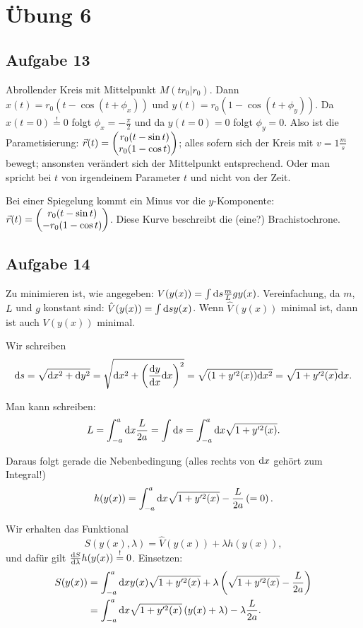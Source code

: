 \chapter*{Übung 6}

\section*{Aufgabe 13}

Abrollender Kreis mit Mittelpunkt $M(t r_0 | r_0)$. Dann $x(t) = r_0 (t - \cos (t + \phi_x))$ und $y(t) = r_0(1 - \cos(t + \phi_y))$. Da $x(t = 0) \overset{!}{=} 0$ folgt $\phi_x = -\frac{\pi}{2}$ und da $y(t = 0) = 0$ folgt $\phi_y = 0$. Also ist die Parametisierung: $\vec{r}(t) = \begin{pmatrix} r_0 (t - \sin t) \\ r_0 (1 - \cos t) \end{pmatrix}$; alles sofern sich der Kreis mit $v = 1 \frac{m}{s}$ bewegt; ansonsten verändert sich der Mittelpunkt entsprechend. Oder man spricht bei $t$ von irgendeinem Parameter $t$ und nicht von der Zeit. 

Bei einer Spiegelung kommt ein Minus vor die $y$-Komponente: $\vec{r}(t) = \begin{pmatrix} r_0 (t - \sin t) \\ - r_0 (1 - \cos t) \end{pmatrix}$. Diese Kurve beschreibt die (eine?) Brachistochrone.

\section*{Aufgabe 14}

Zu minimieren ist, wie angegeben: $V(y(x)) = \int \mathrm{d} s \frac{m}{L} g y(x)$. Vereinfachung, da $m$, $L$ und $g$ konstant sind: $\hat{V}(y(x)) = \int \mathrm{d} s y(x)$. Wenn $\hat{V}(y(x))$ minimal ist, dann ist auch $V(y(x))$ minimal.

Wir schreiben 
\[
	\mathrm{d} s 
	= \sqrt{\mathrm{d} x^2 + \mathrm{d} y^2} 
	= \sqrt{\mathrm{d} x^2 + \left( \frac{\mathrm{d} y}{\mathrm{d} x} \mathrm{d} x \right)^2} 
	= \sqrt{(1 + y'^2(x)) \mathrm{d} x^2}
	= \sqrt{1 + y'^2(x)} \mathrm{d} x
	\text{.}
\]

Man kann schreiben:
\[
	L = \int^a_{-a} \mathrm{d} x \frac{L}{2a} = \int \mathrm{d} s = \int^a_{-a} \mathrm{d} x \sqrt{1 + y'^2(x)}
	\text{.}
\]

Daraus folgt gerade die Nebenbedingung (alles rechts von $\mathrm{d} x$ gehört zum Integral!)
\[
	h(y(x)) = \int^a_{-a} \mathrm{d} x \sqrt{1 + y'^2(x)} - \frac{L}{2a} \left( = 0 \right)
	\text{.}
\]

Wir erhalten das Funktional
\[
	S(y(x), \lambda) = \hat{V}(y(x)) + \lambda h(y(x)),
\]
und dafür gilt $\frac{\mathrm{d} S}{\mathrm{d} \lambda} h(y(x)) \overset{!}{=} 0$. Einsetzen:
\begin{align*}
	S(y(x)) &= \int^a_{-a} \mathrm{d} x y(x) \sqrt{1 + y'^2(x)} + \lambda \left( \sqrt{1 + y'^2(x)} - \frac{L}{2a} \right) \\
	&= \int^a_{-a} \mathrm{d} x \sqrt{1 + y'^2(x)} \left( y(x) + \lambda \right) - \lambda \frac{L}{2a}
	\text{.}
\end{align*}

